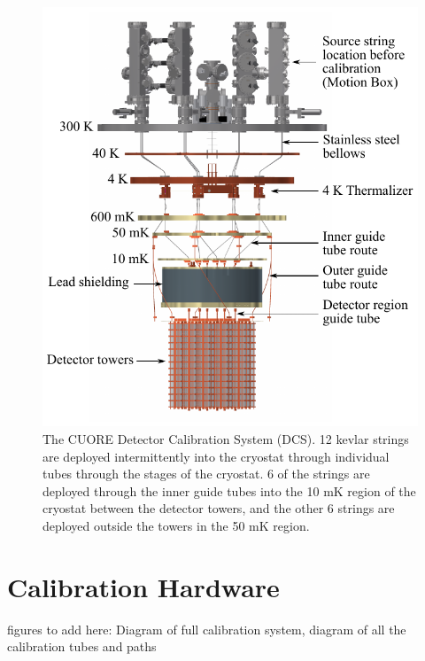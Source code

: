 \begin{figure}[htbp]
\includegraphics[width=\linewidth]{Figures/DCSintegration.pdf}
\caption[The CUORE Detector Calibration System (DCS).]
{The CUORE Detector Calibration System (DCS).
12 kevlar strings are deployed intermittently into the cryostat through individual tubes through the stages of the cryostat. 6 of the strings are deployed through the inner guide tubes into the 10 mK region of the cryostat between the detector towers, and the other 6 strings are deployed outside the towers in the 50 mK region.}
\label{fig:DCSintegration}
\end{figure}

\section{Calibration Hardware}

figures to add here: Diagram of full calibration system, diagram of all the calibration tubes and paths

